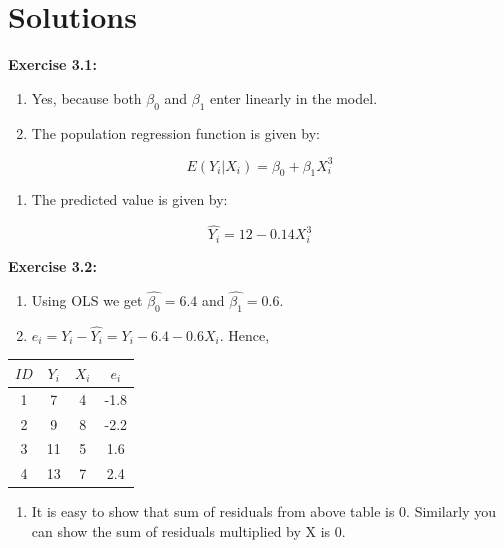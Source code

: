 \documentclass[
]{book}
\providecommand{\tightlist}{%
  \setlength{\itemsep}{0pt}\setlength{\parskip}{0pt}}
\theoremstyle{definition}
\theoremstyle{definition}
\theoremstyle{definition}
\theoremstyle{definition}
\theoremstyle{remark}
\begin{document}
\hypertarget{solutions-2}{%
\section*{Solutions}\label{solutions-2}}

\textbf{Exercise 3.1:}

\begin{enumerate}
\def\labelenumi{\alph{enumi}.}
\item
  Yes, because both \(\beta_0\) and \(\beta_1\) enter linearly in the model.
\item
  The population regression function is given by:
\end{enumerate}

\[E(Y_i|X_i)=\beta_0 + \beta_1 X_i^3\]

\begin{enumerate}
\def\labelenumi{\alph{enumi}.}
\setcounter{enumi}{2}
\tightlist
\item
  The predicted value is given by:
\end{enumerate}

\[\widehat{Y_i}=12 - 0.14 X_i^3\]

\textbf{Exercise 3.2:}

\begin{enumerate}
\def\labelenumi{\alph{enumi}.}
\item
  Using OLS we get \(\widehat{\beta_0}=6.4\) and \(\widehat{\beta_1}=0.6\).
\item
  \(e_i=Y_i-\widehat{Y_i}=Y_i - 6.4-0.6X_i\). Hence,
\end{enumerate}

\begin{longtable}[]{@{}cccc@{}}
\toprule()
\(ID\) & \(Y_i\) & \(X_i\) & \(e_i\) \\
\midrule()
\endhead
1 & 7 & 4 & -1.8 \\
2 & 9 & 8 & -2.2 \\
3 & 11 & 5 & 1.6 \\
4 & 13 & 7 & 2.4 \\
\bottomrule()
\end{longtable}

\begin{enumerate}
\def\labelenumi{\alph{enumi}.}
\setcounter{enumi}{2}
\tightlist
\item
  It is easy to show that sum of residuals from above table is 0. Similarly you can show the sum of residuals multiplied by X is 0.
\end{enumerate}
\end{document}
